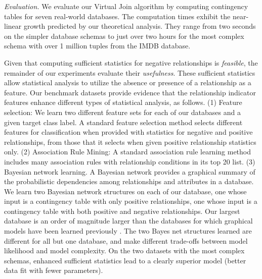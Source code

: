 \documentclass{acm_proc_article-sp}
\begin{document}
\emph{Evaluation.} We evaluate our Virtual Join algorithm by computing contingency tables for seven real-world databases. The computation times exhibit the near-linear growth predicted by our theoretical analysis. 
They range from two seconds on the simpler database schemas to just over two hours for the most complex schema with over 1 million tuples from the IMDB database.

Given that computing sufficient statistics for negative relationships is {\em feasible}, the remainder of our experiments evaluate their {\em usefulness}. These sufficient statistics allow statistical analysis to utilize the absence or presence of a relationship as a feature. 
Our benchmark datasets provide evidence that the relationship indicator features enhance different types of statistical analysis, as follows. (1) Feature selection: We learn two different feature sets for each of our databases and a given target class label. A standard feature selection method selects different features for classification when provided with statistics for negative and positive relationships, from those that it selects when given positive relationship statistics only. (2) Association Rule Mining: A standard association rule learning method includes many association rules with relationship conditions in its top 20 list. 
(3) Bayesian network learning. A Bayesian network provides a graphical summary of the probabilistic dependencies among relationships and attributes in a database. We learn two Bayesian network structures on each of our database, one whose input is a contingency table with only positive relationships, one whose input is a contingency table with both positive and negative relationships. Our largest database is an order of magnitude larger than the databases for which graphical models  have been learned previously \cite{Schulte2012}. The two Bayes net structures learned are different for all but one database, and make different trade-offs between model likelihood and model complexity. On the two datasets with the most complex schemas, enhanced sufficient statistics lead to a clearly superior model (better data fit with fewer parameters).
\end{document}
